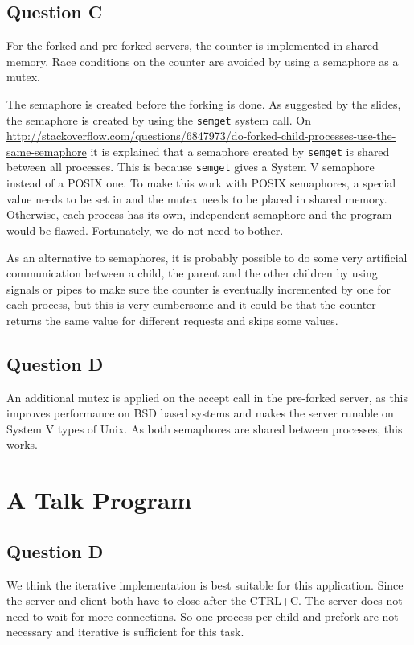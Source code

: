 \documentclass[11pt]{article}
\begin{document}
\subsection{Question C}

For the forked and pre-forked servers, the counter is implemented in shared memory. Race conditions on the counter are avoided by using a semaphore as a mutex.

The semaphore is created before the forking is done. As suggested by the slides, the semaphore is created by using the \texttt{semget} system call. On \url{http://stackoverflow.com/questions/6847973/do-forked-child-processes-use-the-same-semaphore} it is explained that a semaphore created by \texttt{semget} is shared between all processes. This is because \texttt{semget} gives a System V semaphore instead of a POSIX one. To make this work with POSIX semaphores, a special value needs to be set in and the mutex needs to be placed in shared memory. Otherwise, each process has its own, independent semaphore and the program would be flawed. Fortunately, we do not need to bother.

As an alternative to semaphores, it is probably possible to do some very artificial communication between a child, the parent and the other children by using signals or pipes to make sure the counter is eventually incremented by one for each process, but this is very cumbersome and it could be that the counter returns the same value for different requests and skips some values.

\subsection{Question D}

An additional mutex is applied on the accept call in the pre-forked server, as this improves performance on BSD based systems and makes the server runable on System V types of Unix. As both semaphores are shared between processes, this works.

\section{A Talk Program}
\subsection{Question D}
We think the iterative implementation is best suitable for this application. Since the server and client both have to close after the CTRL+C. The server does not need to wait for more connections. So one-process-per-child and prefork are not necessary and iterative is sufficient for this task.
\end{document}

